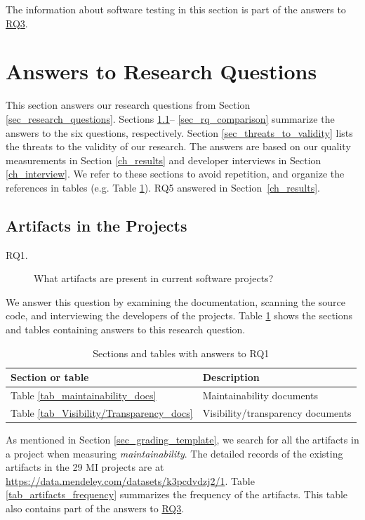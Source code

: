 \documentclass[final, 3p, times, authoryear]{elsarticle}
\begin{document}
The information about software testing in this section is part of the answers to
\hyperlink{rq3}{RQ3}.

\section{Answers to Research Questions} \label{ch_answers}

This section answers our research questions from Section
\ref{sec_research_questions}.  Sections \ref{sec_rq_artifacts}--
\ref{sec_rq_comparison} summarize the answers to the six questions,
respectively. Section \ref{sec_threats_to_validity} lists the threats to the
validity of our research. The answers are based on our quality measurements in
Section \ref{ch_results} and developer interviews in Section \ref{ch_interview}.
We refer to these sections to avoid repetition, and organize the references in
tables (e.g. Table \ref{tab_reference_rq1}).  RQ5 answered in
Section~\ref{ch_results}.

\subsection{Artifacts in the Projects} \label{sec_rq_artifacts}
\begin{description}
\item[RQ1.] What artifacts are present in current software projects?
\end{description}

We answer this question by examining the documentation, scanning the source
code, and interviewing the developers of the projects. Table
\ref{tab_reference_rq1} shows the sections and tables containing answers to this
research question.

\begin{table}[ht]
\centering
\begin{tabular}{ll}
\hline
Section or table & Description \\ \hline
Table \ref{tab_maintainability_docs} & Maintainability documents \\
Table \ref{tab_Visibility/Transparency_docs} & Visibility/transparency documents \\ \hline
\end{tabular}
\caption{\label{tab_reference_rq1}Sections and tables with answers to RQ1}
\end{table}

As mentioned in Section \ref{sec_grading_template}, we search for all the
artifacts in a project when measuring \textit{maintainability}. The detailed
records of the existing artifacts in the 29 MI projects are at
\hyperlink{https://data.mendeley.com/datasets/k3pcdvdzj2/1}{https://data.mendeley.com/datasets/k3pcdvdzj2/1}.
Table \ref{tab_artifacts_frequency} summarizes the frequency of the artifacts.
This table also contains part of the answers to \hyperlink{rq3}{RQ3}.
\end{document}
